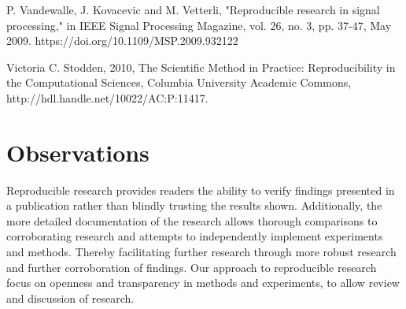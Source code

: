 P. Vandewalle, J. Kovacevic and M. Vetterli, "Reproducible research in signal processing," in IEEE Signal Processing Magazine, vol. 26, no. 3, pp. 37-47, May 2009. https://doi.org/10.1109/MSP.2009.932122


Victoria C. Stodden, 2010, The Scientific Method in Practice: Reproducibility in the Computational Sciences, Columbia University Academic Commons, http://hdl.handle.net/10022/AC:P:11417.


\section{Observations}
Reproducible research provides readers the ability to verify findings presented in a publication rather than blindly trusting the results shown. Additionally, the more detailed documentation of the research allows thorough comparisons to corroborating research and attempts to independently implement experiments and methods. Thereby facilitating further research through more robust research and further corroboration of findings. Our approach to reproducible research focus on openness and transparency in methods and experiments, to allow review and discussion of research.

